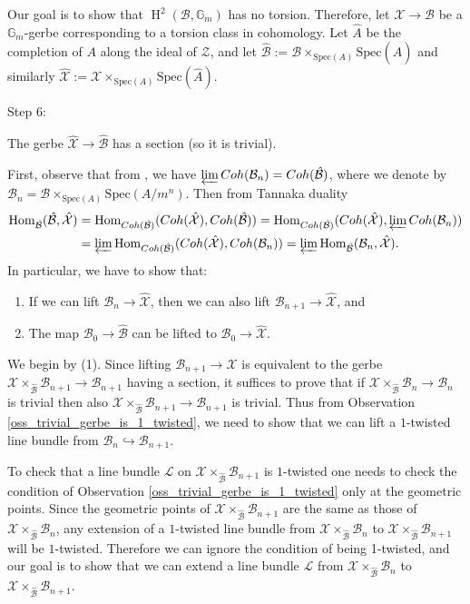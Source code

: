 \documentclass[11pt]{amsart}
\theoremstyle{definition}
\theoremstyle{remark}
\newcommand{\calB}{\mathcal B}
\newcommand{\calL}{\mathcal L}
\newcommand{\calX}{\mathcal X}
\newcommand{\calZ}{\mathcal Z}
\newcommand{\bG}{\mathbb{G}}
\newcommand{\Spec}{\mathrm{Spec}}
\newcommand{\oH}{\operatorname{H}}
\newcommand{\Hom}{\operatorname{Hom}}
\begin{document}
 Our goal is to show that $\oH^2(\calB,\bG_m)$ has no torsion.
Therefore, let $\calX\to \calB$ be a $\bG_m$-gerbe corresponding to a torsion class in cohomology. Let $\hat{A}$ be the completion of $A$ along the ideal of $\calZ$, and let $\hat{\calB}:=\calB\times_{\Spec(A)}\Spec(\hat{A})$ and similarly $\hat{\calX}:=\calX\times_{\Spec(A)}\Spec(\hat{A})$.

\begin{bf}Step 6:\end{bf} The gerbe $\hat{\calX}\to \hat{\calB}$ has a section (so it is trivial).

First, observe that from \cite[Theorem 1.4]{Ols05}, we have $\varprojlim Coh(\calB_n) = Coh(\hat{\calB})$, where we denote by $\calB_n=\calB\times_{\Spec(A)}\Spec(A/m^n)$. Then from Tannaka duality
\begin{align*}
    \Hom_{\hat{\calB}}(\hat{\calB}, \hat{\calX}) &= \Hom_{Coh(\hat{\calB})}(Coh(\hat{\calX}),Coh(\hat{\calB})) = \Hom_{Coh(\hat{\calB})}(Coh(\hat{\calX}),\varprojlim Coh(\calB_n)) \\&=\varprojlim \Hom_{Coh(\hat{\calB})}(Coh(\hat{\calX}), Coh(\calB_n)) = \varprojlim \Hom_{\hat{\calB}}(\calB_n,\hat{\calX}).
\end{align*}
In particular, we have to show that:
\begin{enumerate}
    \item If we can lift $\calB_n\to \hat{\calX}$, then we can also lift $\calB_{n+1}\to \hat{\calX}$, and
    \item The map $\calB_0\to \hat{\calB}$ can be lifted to $\calB_0\to \hat{\calX}$.
\end{enumerate}
We begin by (1). Since lifting $\calB_{n+1}\to \calX$ is equivalent to the gerbe $\calX\times_{\hat{\calB}}\calB_{n+1} \to \calB_{n+1}$ having a section, it suffices to prove that if $\calX\times_{\hat{\calB}}\calB_{n} \to \calB_{n}$ is trivial then also $\calX\times_{\hat{\calB}}\calB_{n+1} \to \calB_{n+1}$ is trivial. 
Thus from Observation \ref{oss_trivial_gerbe_is_1_twisted}, we need to show that we can lift a $1$-twisted line bundle from $\calB_n\hookrightarrow \calB_{n+1}$. 

To check that a line bundle $\calL$ on $\calX\times_{\hat{\calB}}\calB_{n+1}$ is $1$-twisted one needs to check the condition of Observation \ref{oss_trivial_gerbe_is_1_twisted} only at the geometric points. Since the geometric points of $\calX\times_{\hat{\calB}}\calB_{n+1}$ are the same as those of $\calX\times_{\hat{\calB}}\calB_{n}$, any extension of a $1$-twisted line bundle from $\calX\times_{\hat{\calB}}\calB_{n}$ to $\calX\times_{\hat{\calB}}\calB_{n+1}$ will be $1$-twisted. Therefore we can ignore the condition of being 1-twisted, and our goal is to show that we can extend a line bundle $\calL$ from $\calX\times_{\hat{\calB}}\calB_n$ to $\calX\times_{\hat{\calB}}\calB_{n+1}$.
\end{document}
